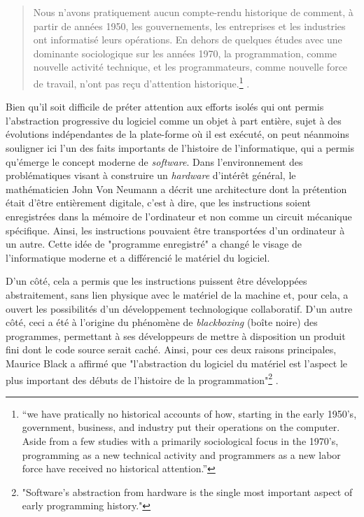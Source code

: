 \begin{quote} 
Nous n'avons pratiquement aucun compte-rendu historique de comment, à partir de années 1950, les gouvernements, les entreprises et les industries ont informatisé leurs opérations. En dehors de quelques études avec une dominante sociologique sur les années 1970, la programmation, comme nouvelle activité technique, et les programmateurs, comme nouvelle force de travail, n'ont pas reçu d'attention historique.\footnote{“we have pratically no historical accounts of how, starting in the early 1950's, government, business, and industry put their operations on the computer. Aside from a few studies with a primarily sociological focus in the 1970's, programming as a new technical activity and programmers as a new labor force have received no historical attention.”} \citep[p.92]{Mahoney2002}.
\end{quote}

Bien qu'il soit difficile de préter attention aux efforts isolés qui ont permis l'abstraction progressive du logiciel comme un objet à part entière, sujet à des évolutions indépendantes de la plate-forme où il est exécuté, on peut néanmoins souligner ici l'un des faits importants de l'histoire de l'informatique, qui a permis qu'émerge le concept moderne de \emph{software}. Dans l'environnement des problématiques visant à construire un \emph{hardware} d'intérêt général, le mathématicien John Von Neumann a décrit \citep{Neumann1945} une architecture dont la prétention était d'être entièrement digitale, c'est à dire, que les instructions soient enregistrées dans la mémoire de l'ordinateur et non comme un circuit mécanique spécifique. Ainsi, les instructions pouvaient être transportées d'un ordinateur à un autre. Cette idée de "programme enregistré" a changé le visage de l'informatique moderne et a différencié le matériel du logiciel.

D'un côté, cela a permis que les instructions puissent être développées abstraitement, sans lien physique avec le matériel de la machine et, pour cela, a ouvert les possibilités d'un développement technologique collaboratif. D'un autre côté, ceci a été à l'origine du phénomène de \emph{blackboxing} (boîte noire) des programmes, permettant à ses développeurs de mettre à disposition un produit fini dont le code source serait caché. Ainsi, pour ces deux raisons principales, Maurice Black a affirmé que "l'abstraction du logiciel du matériel est l'aspect le plus important des débuts de l'histoire de la programmation"\footnote{"Software's abstraction from hardware is the single most important aspect of early programming history."} \citep[p.49]{Black2002}.

